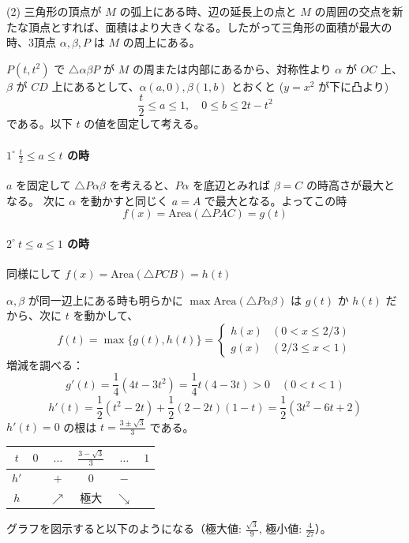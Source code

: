\documentclass[../main.tex]{subfiles}
\begin{document}
\medskip
\noindent
(2) 三角形の頂点が $M$ の弧上にある時、辺の延長上の点と $M$ の周囲の交点を新たな頂点とすれば、面積はより大きくなる。したがって三角形の面積が最大の時、3頂点 $\alpha, \beta, P$ は $M$ の周上にある。

$P(t, t^2)$ で $\triangle \alpha \beta P$ が $M$ の周または内部にあるから、対称性より $\alpha$ が $OC$ 上、$\beta$ が $CD$ 上にあるとして、$\alpha(a,0), \beta(1,b)$ とおくと ($y=x^2$ が下に凸より)
\[
  \frac{t}{2} \le a \le 1, \quad 0 \le b \le 2t - t^2
\]
である。以下 $t$ の値を固定して考える。

\paragraph{$1^\circ \ \frac{t}{2} \le a \le t$ の時}
$a$ を固定して $\triangle P \alpha \beta$ を考えると、$P\alpha$ を底辺とみれば $\beta = C$ の時高さが最大となる。
次に $\alpha$ を動かすと同じく $a = A$ で最大となる。よってこの時
\[
  f(x) = \text{Area}(\triangle PAC) = g(t)
\]

\paragraph{$2^\circ \ t \le a \le 1$ の時}
同様にして $f(x) = \text{Area}(\triangle PCB) = h(t)$

\medskip
$\alpha, \beta$ が同一辺上にある時も明らかに $\max \text{Area}(\triangle P\alpha\beta)$ は $g(t)$ か $h(t)$ だから、次に $t$ を動かして、
\[
  f(t) = \max \{ g(t), h(t) \} =
  \begin{cases}
    h(x) & (0 < x \le 2/3) \\
    g(x) & (2/3 \le x < 1)
  \end{cases}
\]
増減を調べる：
\[
  g'(t) = \frac{1}{4}(4t - 3t^2) = \frac{1}{4}t(4-3t) > 0 \quad \left(0 < t < 1\right)
\]
\[
  h'(t) = \frac{1}{2}(t^2 - 2t) + \frac{1}{2}(2 - 2t)(1-t) = \frac{1}{2}(3t^2 - 6t + 2)
\]
$h'(t) = 0$ の根は $t = \frac{3 \pm \sqrt{3}}{3}$ である。

\begin{center}
  \begin{tabular}{c|ccccc}
    $t$ & $0$ & $\dots$ & $\frac{3-\sqrt{3}}{3}$ & $\dots$ & $1$ \\
    \hline
    $h'$ & & $+$ & $0$ & $-$ & \\
    \hline
    $h$ & & $\nearrow$ & 極大 & $\searrow$ &
  \end{tabular}
\end{center}

グラフを図示すると以下のようになる（極大値: $\frac{\sqrt{3}}{9}$, 極小値: $\frac{4}{27}$）。
\end{document}
